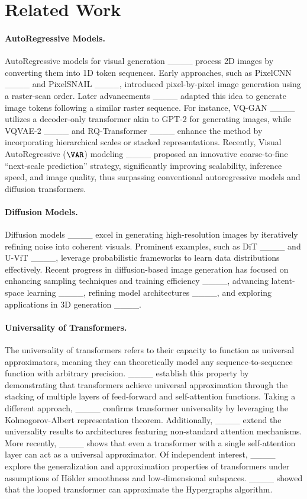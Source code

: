 \section{Related Work}
\label{sec:related_work}

\paragraph{AutoRegressive Models.} AutoRegressive models for visual generation ____ process 2D images by converting them into 1D token sequences. Early approaches, such as PixelCNN ____ and PixelSNAIL ____, introduced pixel-by-pixel image generation using a raster-scan order. Later advancements ____ adapted this idea to generate image tokens following a similar raster sequence. For instance, VQ-GAN ____ utilizes a decoder-only transformer akin to GPT-2 for generating images, while VQVAE-2 ____ and RQ-Transformer ____ enhance the method by incorporating hierarchical scales or stacked representations. Recently, Visual AutoRegressive ($\VAR$) modeling ____ proposed an innovative coarse-to-fine ``next-scale prediction'' strategy, significantly improving scalability, inference speed, and image quality, thus surpassing conventional autoregressive models and diffusion transformers.

\paragraph{Diffusion Models.} Diffusion models ____ excel in generating high-resolution images by iteratively refining noise into coherent visuals. Prominent examples, such as DiT ____ and U-ViT ____, leverage probabilistic frameworks to learn data distributions effectively. Recent progress in diffusion-based image generation has focused on enhancing sampling techniques and training efficiency ____, advancing latent-space learning ____, refining model architectures ____, and exploring applications in 3D generation ____.



\paragraph{Universality of Transformers.}
The universality of transformers refers to their capacity to function as universal approximators, meaning they can theoretically model any sequence-to-sequence function with arbitrary precision. ____ establish this property by demonstrating that transformers achieve universal approximation through the stacking of multiple layers of feed-forward and self-attention functions. Taking a different approach, ____ confirms transformer universality by leveraging the Kolmogorov-Albert representation theorem. Additionally, ____ extend the universality results to architectures featuring non-standard attention mechanisms. More recently, ____ shows that even a transformer with a single self-attention layer can act as a universal approximator. Of independent interest, ____ explore the generalization and approximation properties of transformers under assumptions of Hölder smoothness and low-dimensional subspaces. ____ showed that the looped transformer can approximate the Hypergraphs algorithm.